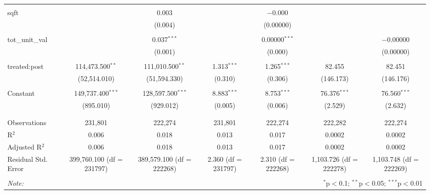 \begin{table}[H]
{\begin{tabular}{@{\extracolsep{5pt}}lcccccc}
   & & & & & & \\  

  sqft &  & 0.003 &  & $-$0.000 &  &  \\  

   &  & (0.004) &  & (0.00000) &  &  \\  

   & & & & & & \\  

  tot\_unit\_val &  & 0.037$^{***}$ &  & 0.00000$^{***}$ &  & $-$0.00000 \\  

   &  & (0.001) &  & (0.000) &  & (0.00000) \\  

   & & & & & & \\  

  treated:post & 114,473.500$^{**}$ & 111,010.500$^{**}$ & 1.313$^{***}$ & 1.265$^{***}$ & 82.455 & 82.451 \\  

   & (52,514.010) & (51,594.330) & (0.310) & (0.306) & (146.173) & (146.176) \\  

   & & & & & & \\  

  Constant & 149,737.400$^{***}$ & 128,597.500$^{***}$ & 8.883$^{***}$ & 8.753$^{***}$ & 76.376$^{***}$ & 76.560$^{***}$ \\  

   & (895.010) & (929.012) & (0.005) & (0.006) & (2.529) & (2.632) \\  

   & & & & & & \\  

 \hline \\[-1.8ex]  

 Observations & 231,801 & 222,274 & 231,801 & 222,274 & 222,282 & 222,274 \\  

 R$^{2}$ & 0.006 & 0.018 & 0.013 & 0.017 & 0.0002 & 0.0002 \\  

 Adjusted R$^{2}$ & 0.006 & 0.018 & 0.013 & 0.017 & 0.0002 & 0.0002 \\  

 Residual Std. Error & 399,760.100 (df = 231797) & 389,579.100 (df = 222268) & 2.360 (df = 231797) & 2.310 (df = 222268) & 1,103.726 (df = 222278) & 1,103.748 (df = 222269) \\  

 \hline  

 \hline \\[-1.8ex]  

 \textit{Note:}  & \multicolumn{6}{r}{$^{*}$p$<$0.1; $^{**}$p$<$0.05; $^{***}$p$<$0.01} \\  

 \end{tabular}}  

 \end{table}  

